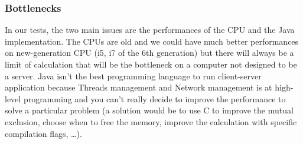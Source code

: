 \subsubsection{Bottlenecks}
\label{subs:Bottlenecks}

In our tests, the two main issues are the performances of the CPU and the Java
implementation. The CPUs are old and we could have much better performances on
new-generation CPU (i5, i7 of the 6th generation) but there will always be a
limit of calculation that will be the bottleneck on a computer not designed to be a server. Java isn't the best programming language to run client-server application because Threads management and Network management is at high-level programming and you can't really decide to improve the performance to solve a particular problem (a solution would be to use C to improve the mutual exclusion, choose when to free the memory, improve the calculation with specific compilation flags, \ldots). \newline
